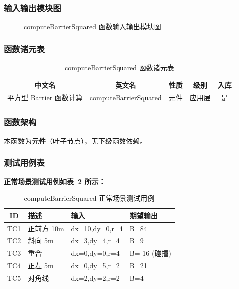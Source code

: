 \documentclass[a4paper,10pt]{article}
\begin{document}
\subsubsection{输入输出模块图}
\begin{figure}[h]
    \centering
    \caption{computeBarrierSquared 函数输入输出模块图}
    \label{fig:io_computeBarrierSquared}
\end{figure}
\subsubsection{函数诸元表}
\begin{table}[h]
    \centering
    \caption{computeBarrierSquared 函数诸元表}
    \label{tab:meta_computeBarrierSquared}
    \begin{tabular}{|c|c|c|c|c|}
        \hline
        中文名 & 英文名 & 性质 & 级别 & 入库 \\ \hline
        平方型 Barrier 函数计算 & computeBarrierSquared & 元件 & 应用层 & 是 \\ \hline
    \end{tabular}
\end{table}
\subsubsection{函数架构}
\par 本函数为\textbf{元件}（叶子节点），无下级函数依赖。

\subsubsection{测试用例表}
\noindent\textbf{正常场景测试用例如表~\ref{tab:normal_computeBarrierSquared} 所示：}
\begin{table}[h]
\centering
\caption{computeBarrierSquared 正常场景测试用例}
\label{tab:normal_computeBarrierSquared}
\begin{tabular}{|c|p{3.5cm}|p{3.5cm}|p{3.5cm}|}
\hline
ID & 描述 & 输入 & 期望输出 \\ \hline
  TC1 & 正前方 10m & dx=10,dy=0,r=4 & B=84 \\ \hline
  TC2 & 斜向 5m & dx=3,dy=4,r=4 & B=9 \\ \hline
  TC3 & 重合 & dx=0,dy=0,r=4 & B=-16 (碰撞) \\ \hline
  TC4 & 正左 5m & dx=0,dy=5,r=2 & B=21 \\ \hline
  TC5 & 对角线 & dx=2,dy=2,r=2 & B=4 \\ \hline
\end{tabular}
\end{table}
\end{document}
